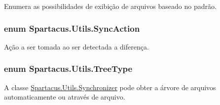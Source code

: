 Enumera as possibilidades de exibição de arquivos baseado no padrão. 

\hypertarget{namespaceSpartacus_1_1Utils_a835f63b39808393d4b72d203056ae42e}{
\subsubsection[{Sync\+Action}]{\setlength{\rightskip}{0pt plus 5cm}enum {\bf Spartacus.\+Utils.\+Sync\+Action}}}\label{namespaceSpartacus_1_1Utils_a835f63b39808393d4b72d203056ae42e}


Ação a ser tomada ao ser detectada a diferença. 

\hypertarget{namespaceSpartacus_1_1Utils_ae4b47116ae1dc35f3dc3ea735874beee}{
\subsubsection[{Tree\+Type}]{\setlength{\rightskip}{0pt plus 5cm}enum {\bf Spartacus.\+Utils.\+Tree\+Type}}}\label{namespaceSpartacus_1_1Utils_ae4b47116ae1dc35f3dc3ea735874beee}


A classe \hyperlink{classSpartacus_1_1Utils_1_1Synchronizer}{Spartacus.\+Utils.\+Synchronizer} pode obter a árvore de arquivos automaticamente ou através de arquivo. 

